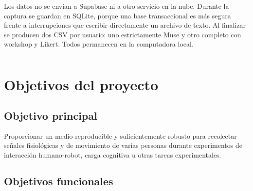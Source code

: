 \documentclass[11pt,a4paper]{article}
\begin{document}
Los datos no se envían a Supabase ni a otro servicio en la nube. Durante la captura se guardan en SQLite, porque una base transaccional es más segura frente a interrupciones que escribir directamente un archivo de texto. Al finalizar se producen dos CSV por usuario: uno estrictamente Muse y otro completo con workshop y Likert. Todos permanecen en la computadora local.

\medskip\hrule\medskip

\section{Objetivos del proyecto}

\subsection{Objetivo principal}

Proporcionar un medio reproducible y suficientemente robusto para recolectar señales fisiológicas y de movimiento de varias personas durante experimentos de interacción humano-robot, carga cognitiva u otras tareas experimentales.

\subsection{Objetivos funcionales}
\end{document}
